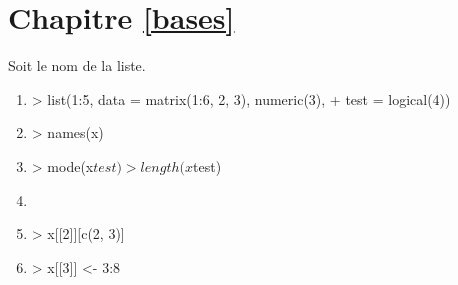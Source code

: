 \section*{Chapitre \ref{bases}}
\begin{reponse}{2.1}
    Soit  le nom de la liste.
    \begin{enumerate}
\item
\begin{Schunk}
\begin{Sinput}
> list(1:5, data = matrix(1:6, 2, 3), numeric(3),
+     test = logical(4))
\end{Sinput}
\end{Schunk}
\item
\begin{Schunk}
\begin{Sinput}
> names(x)
\end{Sinput}
\end{Schunk}
\item
\begin{Schunk}
\begin{Sinput}
> mode(x$test)
> length(x$test)
\end{Sinput}
\end{Schunk}
\item
\begin{Schunk}
\end{Schunk}
\item
\begin{Schunk}
\begin{Sinput}
> x[[2]][c(2, 3)]
\end{Sinput}
\end{Schunk}
\item
\begin{Schunk}
\begin{Sinput}
> x[[3]] <- 3:8
\end{Sinput}
\end{Schunk}
    \end{enumerate}
  
\end{reponse}
